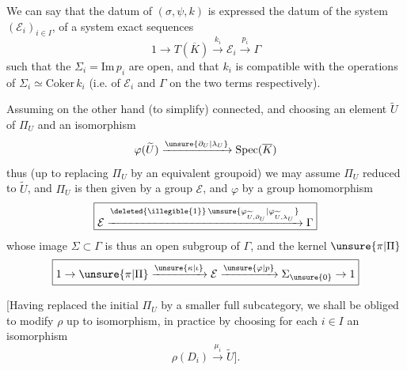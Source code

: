 
We can say that the datum of $(\sigma,\psi,k)$ is expressed
the datum of the system $(\mathcal E_i)_{i\in I}$, of a system
  exact sequences
\[
\boxed{1\to T(\overline K)\xrightarrow{k_i}\mathcal E_i
\xrightarrow{p_i}\Gamma}
\]
such that the $\Sigma_i
=\mathrm{Im}\,p_i$ are open, and that $k_i$ is compatible
with the operations of $\Sigma_i\simeq\mathrm{Coker}\,k_i$
(i.e. of $\mathcal E_i$ and $\Gamma$ on the two terms respectively).



Assuming on the other hand (to simplify)
 connected,
and choosing an element $\widetilde U$ of $\Pi_U$ and an isomorphism
\[
\varphi(\widetilde U)\xrightarrow{\unsure{\partial_U|\lambda_U}}
\mathrm{Spec}(\overline K)
\]
thus (up to replacing $\Pi_U$ by an equivalent groupoid)
we may assume $\Pi_U$ reduced to $\widetilde U$, and $\Pi_U$ is then given by
a group $\mathcal E$, and $\varphi$ by a group homomorphism
\[
\boxed{\mathcal E
\xrightarrow{\deleted{\illegible{1}}\,\unsure{\varphi_{\widetilde U,\partial_U}|\varphi_{\widetilde U,\lambda_U}}}
\Gamma}
\]
whose image $\Sigma\subset\Gamma$ is thus an open subgroup
of $\Gamma$, and the kernel  $\unsure{\pi|\Pi}$
\[
\boxed{1\to\unsure{\pi|\Pi}\xrightarrow{\unsure{\kappa|\iota}}\mathcal E
\xrightarrow{\unsure{\varphi|p}}\Sigma_{\unsure{0}}\to1}
\]


[Having replaced the initial $\Pi_U$ by a smaller full subcategory,
we shall be obliged to modify $\rho$ up to isomorphism,
in practice by choosing for each $i\in I$ an isomorphism
\[
\rho(D_i)\xrightarrow{\mu_i}\widetilde U].
\]

